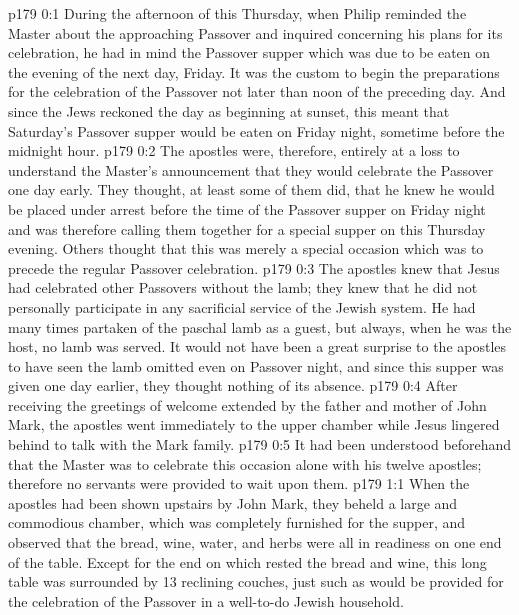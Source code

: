 \author{Midwayer Commission}
\vs p179 0:1 During the afternoon of this Thursday, when Philip reminded the Master about the approaching Passover and inquired concerning his plans for its celebration, he had in mind the Passover supper which was due to be eaten on the evening of the next day, Friday. It was the custom to begin the preparations for the celebration of the Passover not later than noon of the preceding day. And since the Jews reckoned the day as beginning at sunset, this meant that Saturday’s Passover supper would be eaten on Friday night, sometime before the midnight hour.
\vs p179 0:2 The apostles were, therefore, entirely at a loss to understand the Master’s announcement that they would celebrate the Passover one day early. They thought, at least some of them did, that he knew he would be placed under arrest before the time of the Passover supper on Friday night and was therefore calling them together for a special supper on this Thursday evening. Others thought that this was merely a special occasion which was to precede the regular Passover celebration.
\vs p179 0:3 The apostles knew that Jesus had celebrated other Passovers without the lamb; they knew that he did not personally participate in any sacrificial service of the Jewish system. He had many times partaken of the paschal lamb as a guest, but always, when he was the host, no lamb was served. It would not have been a great surprise to the apostles to have seen the lamb omitted even on Passover night, and since this supper was given one day earlier, they thought nothing of its absence.
\vs p179 0:4 After receiving the greetings of welcome extended by the father and mother of John Mark, the apostles went immediately to the upper chamber while Jesus lingered behind to talk with the Mark family.
\vs p179 0:5 It had been understood beforehand that the Master was to celebrate this occasion alone with his twelve apostles; therefore no servants were provided to wait upon them.
\vs p179 1:1 When the apostles had been shown upstairs by John Mark, they beheld a large and commodious chamber, which was completely furnished for the supper, and observed that the bread, wine, water, and herbs were all in readiness on one end of the table. Except for the end on which rested the bread and wine, this long table was surrounded by 13 reclining couches, just such as would be provided for the celebration of the Passover in a well\hyp{}to\hyp{}do Jewish household.
